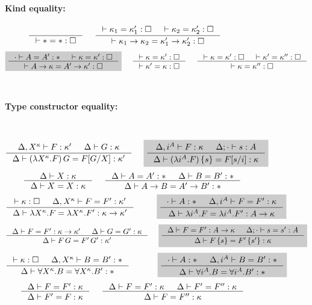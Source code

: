 \begin{figure}
\paragraph{Kind equality:} ~~ 
$
 ~~~~
   \inference{}{|- * = *:\square}
 ~~~~
   \inference{ |- \kappa_1 = \kappa_1' : \square
             & |- \kappa_2 = \kappa_2' : \square }
             {|- \kappa_1 -> \kappa_2 = \kappa_1' -> \kappa_2' : \square}
$
\[ \newFi{
   \inference{\cdot |- A=A':* & |- \kappa=\kappa':\square}
             {|- A -> \kappa = A' -> \kappa' : \square} }
 ~~~~
   \inference{|- \kappa=\kappa':\square}
             {|- \kappa'=\kappa:\square}
 ~~~~
   \inference{ |- \kappa =\kappa' :\square
             & |- \kappa'=\kappa'':\square}
             {|- \kappa=\kappa'':\square}
\]
~\\
\paragraph{Type constructor equality:} ~~ 
\[ \inference{\Delta,X^\kappa |- F:\kappa' & \Delta |- G:\kappa}
             {\Delta |- (\lambda X^\kappa.F)\,G = F[G/X]:\kappa'}
 ~~~~ \newFi{
   \inference{\Delta,i^A |- F:\kappa & \Delta;\cdot |- s:A}
             {\Delta |- (\lambda i^A.F)\,\{s\} = F[s/i]:\kappa} }
\]
\[ \inference{\Delta |- X:\kappa }{\Delta |- X=X:\kappa}
 ~~~~
   \inference{\Delta |- A=A':* & \Delta |- B=B':*}{\Delta |- A-> B=A'-> B':*}
\]
\[ \inference{|- \kappa:\square & \Delta,X^\kappa |- F=F' : \kappa'}
             {\Delta |- \lambda X^\kappa.F=\lambda X^\kappa.F':\kappa-> \kappa'}
 ~~~~ \quad ~
 \newFi{
   \inference{\cdot |- A:* & \Delta,i^A |- F=F' : \kappa}
             {\Delta |- \lambda i^A.F=\lambda i^A.F' : A -> \kappa}
     }
\]
\[ \inference{\Delta |- F=F':\kappa->\kappa' & \Delta |- G=G':\kappa}
             {\Delta |- F\,G = F'\,G' : \kappa'}
 ~~~~ \newFi{
 \inference{\Delta |- F=F':A->\kappa & \Delta;\cdot |- s=s':A}
             {\Delta |- F\,\{s\} = F'\,\{s'\} : \kappa}
     }
\]
\[
   \inference{|- \kappa:\square & \Delta,X^\kappa |- B=B':*}
             {\Delta |- \forall X^\kappa.B=\forall X^\kappa.B':*}
 ~~~~ \qquad
 \newFi{
   \inference{\cdot |- A:* & \Delta,i^A |- B=B':*}
             {\Delta |- \forall i^A.B=\forall i^A.B':*} }
\]
\[ \inference{\Delta |- F = F' : \kappa}{\Delta |- F' = F : \kappa}
 ~~~~
   \inference{\Delta |- F = F' : \kappa & \Delta |- F' = F'' : \kappa}
             {\Delta |- F = F'' : \kappa}
\]
~\\

\end{figure}
